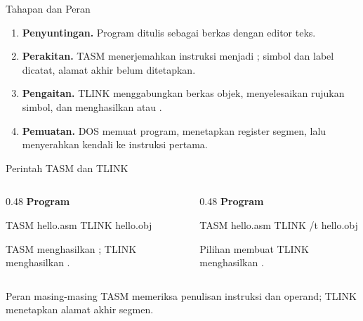 \documentclass[aspectratio=169,11pt]{beamer}
\begin{document}
\begin{frame}{Tahapan dan Peran}
\small
\begin{enumerate}
    \item \textbf{Penyuntingan.} Program ditulis sebagai berkas
           dengan editor teks.

    \vspace{0.15em}
    \item \textbf{Perakitan.} TASM menerjemahkan instruksi menjadi
          ; simbol dan label dicatat, alamat akhir belum
          ditetapkan.

    \vspace{0.15em}
    \item \textbf{Pengaitan.} TLINK menggabungkan berkas objek,
          menyelesaikan rujukan simbol, dan menghasilkan
           atau .

    \vspace{0.15em}
    \item \textbf{Pemuatan.} DOS memuat program, menetapkan register
          segmen, lalu menyerahkan kendali ke instruksi pertama.
\end{enumerate}
\end{frame}

\begin{frame}[fragile]{Perintah TASM dan TLINK}
\begin{columns}[t]
\begin{column}{0.48\textwidth}
{\color{obeTeal}\bfseries Program }\\[0.25em]
\begin{keluaran}
TASM hello.asm
TLINK hello.obj
\end{keluaran}

\vspace{0.3em}
{\footnotesize TASM menghasilkan ; TLINK menghasilkan
.\par}
\end{column}
\begin{column}{0.48\textwidth}
{\color{obeTeal}\bfseries Program }\\[0.25em]
\begin{keluaran}
TASM hello.asm
TLINK /t hello.obj
\end{keluaran}

\vspace{0.3em}
{\footnotesize Pilihan  membuat TLINK menghasilkan
.\par}
\end{column}
\end{columns}

\vspace{0.4em}
\begin{block}{Peran masing-masing}
\small TASM memeriksa penulisan instruksi dan operand; TLINK
menetapkan alamat akhir segmen.
\end{block}
\end{frame}
\end{document}

